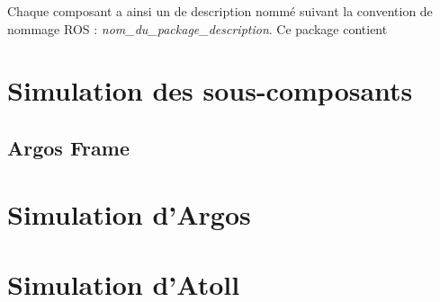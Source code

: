 		Chaque composant a ainsi un  de description nommé suivant la convention de nommage \gls{ROS} : \textit{nom_du_package_description}. Ce package contient 

	\section{Simulation des sous-composants}
		\subsection{\gls{Argos} Frame}


	\section{Simulation d'Argos}

	\section{Simulation d'Atoll}